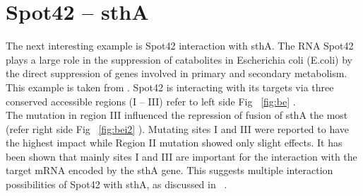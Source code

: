 \documentclass[twoside,a4paper]{report}
\numberwithin{equation}{section}
\begin{document}
\clearpage
	
	
	
	\section{Spot42 – sthA }
	
	The next interesting example is Spot42 interaction with sthA. The RNA Spot42 plays a large role in the suppression of catabolites in Escherichia coli (E.coli) by the direct suppression of genes involved in primary and secondary metabolism.\\
	
	This example is taken from \citep{beisel2011base}. Spot42 is interacting with its targets via three conserved accessible regions (I – III) refer to left side Fig ~\ref{fig:be} . \\
	The mutation in region III influenced the repression of fusion of sthA the most (refer right side Fig ~\ref{fig:bei2} ). Mutating sites I and III were reported to have the highest impact while Region II mutation showed only slight effects. It has been shown that mainly sites I and III are important for the interaction with the target mRNA encoded by the sthA gene. This suggests multiple interaction possibilities of Spot42 with sthA, as discussed in  ~\citet{mann2017intarna}.\\
%	
	
	
	
\end{document}

